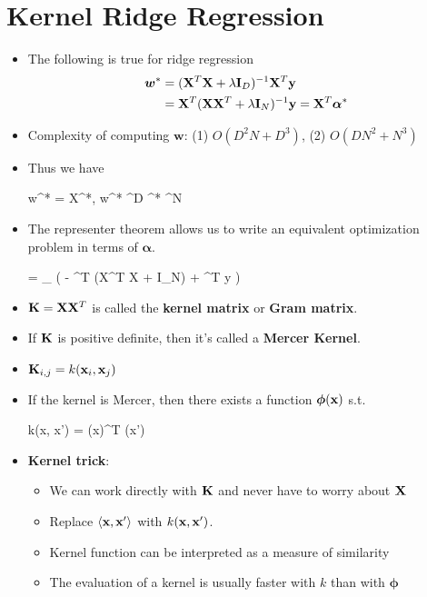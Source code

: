 \section{Kernel Ridge Regression}
\begin{itemize}
	\item The following is true for ridge regression
	\begin{align}
	    \bm w^* &= (\mathbf{X}^T \mathbf{X} + \lambda \mathbf{I}_D)^{-1} \mathbf{X}^T \mathbf{y} \\
	    &= \mathbf{X}^T(\mathbf{X}\mathbf{X}^T + \lambda \mathbf{I}_N)^{-1} \mathbf{y} = \mathbf{X}^T \bm \alpha^* \nonumber
	\end{align}
	\item Complexity of computing $\bm w$: (1) $O(D^2 N + D^3)$, (2) $O(D N^2 + N^3)$
	\item Thus we have
	\begin{myalign*}
	    \bm w^* = \*X\bm \alpha^*, \quad {} \bm w^* \in \R^D  \bm \alpha^* \in \R^N
	\end{myalign*}
	\item The representer theorem allows us to write an equivalent optimization problem in terms of $\bm \alpha$.
	\begin{myalign*}
	    \bm \alpha = \argmax_{\bm \alpha} 
	    \left(
	    - \bm \alpha^T (\*X^T \*X + \lambda \*I_N) \bm \alpha + \bm \alpha^T \*y 
	    \right)
	\end{myalign*}
	\item $\mathbf{K} = \mathbf{X} \mathbf{X}^T$ is called the \textbf{kernel matrix} or \textbf{Gram matrix}.
	\item If $\mathbf{K}$ is positive definite, then it's called a \textbf{Mercer Kernel}.
	\item $\mathbf{K}_{i,j} = k(\mathbf{x}_i, \mathbf{x}_j)$
	\item If the kernel is Mercer, then there exists a function $\bm \phi(\mathbf{x})$ s.t.
	\begin{myalign*}
	    k(\*x, \*x') = \bm \phi(\*x)^T \bm \phi(\*x')
	\end{myalign*}
	\item \textbf{Kernel trick}: 
	\begin{itemize}
		\item We can work directly with $\mathbf{K}$ and never have to worry about $\mathbf{X}$
		\item Replace $\langle \mathbf{x}, \mathbf{x}' \rangle$ with $k(\mathbf{x}, \mathbf{x}')$.
		\item Kernel function can be interpreted as a measure of similarity
		\item The evaluation of a kernel is usually faster with $k$ than with $\bm \phi$

\end{itemize}
\end{itemize}
